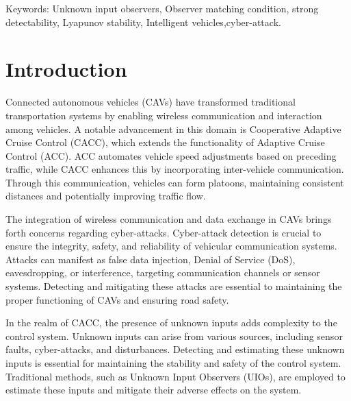 \documentclass[conference]{IEEEtran}
\begin{document}
\begin{Keywords}
Keywords: Unknown input observers, Observer matching condition, strong detectability, Lyapunov stability, Intelligent vehicles,cyber-attack.
\end{Keywords}

\section{Introduction}

Connected autonomous vehicles (CAVs) have transformed traditional transportation systems by enabling wireless communication and interaction among vehicles. A notable advancement in this domain is Cooperative Adaptive Cruise Control (CACC), which extends the functionality of Adaptive Cruise Control (ACC). ACC automates vehicle speed adjustments based on preceding traffic, while CACC enhances this by incorporating inter-vehicle communication. Through this communication, vehicles can form platoons, maintaining consistent distances and potentially improving traffic flow.

The integration of wireless communication and data exchange in CAVs brings forth concerns regarding cyber-attacks. Cyber-attack detection is crucial to ensure the integrity, safety, and reliability of vehicular communication systems. Attacks can manifest as false data injection, Denial of Service (DoS), eavesdropping, or interference, targeting communication channels or sensor systems. Detecting and mitigating these attacks are essential to maintaining the proper functioning of CAVs and ensuring road safety.


In the realm of CACC, the presence of unknown inputs adds complexity to the control system. Unknown inputs can arise from various sources, including sensor faults, cyber-attacks, and disturbances. Detecting and estimating these unknown inputs is essential for maintaining the stability and safety of the control system. Traditional methods, such as Unknown Input Observers (UIOs), are employed to estimate these inputs and mitigate their adverse effects on the system.
\end{document}
